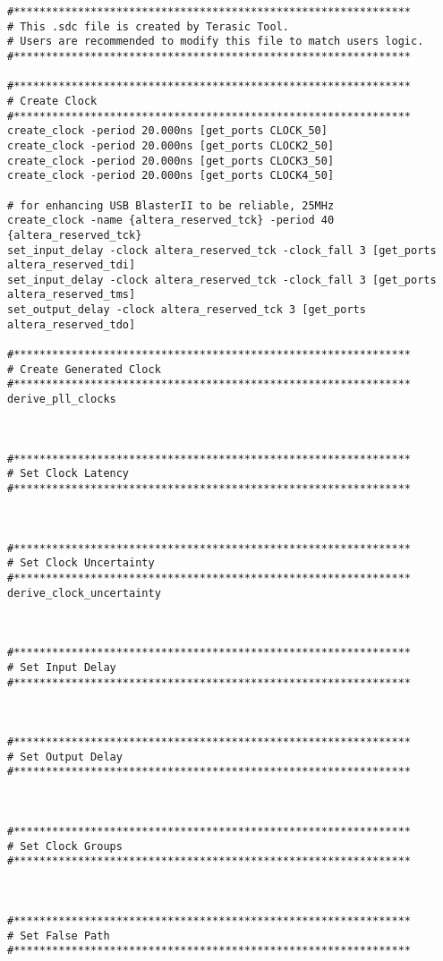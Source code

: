 \begin{verbatim}
#**************************************************************
# This .sdc file is created by Terasic Tool.
# Users are recommended to modify this file to match users logic.
#**************************************************************

#**************************************************************
# Create Clock
#**************************************************************
create_clock -period 20.000ns [get_ports CLOCK_50]
create_clock -period 20.000ns [get_ports CLOCK2_50]
create_clock -period 20.000ns [get_ports CLOCK3_50]
create_clock -period 20.000ns [get_ports CLOCK4_50]

# for enhancing USB BlasterII to be reliable, 25MHz
create_clock -name {altera_reserved_tck} -period 40 {altera_reserved_tck}
set_input_delay -clock altera_reserved_tck -clock_fall 3 [get_ports altera_reserved_tdi]
set_input_delay -clock altera_reserved_tck -clock_fall 3 [get_ports altera_reserved_tms]
set_output_delay -clock altera_reserved_tck 3 [get_ports altera_reserved_tdo]

#**************************************************************
# Create Generated Clock
#**************************************************************
derive_pll_clocks



#**************************************************************
# Set Clock Latency
#**************************************************************



#**************************************************************
# Set Clock Uncertainty
#**************************************************************
derive_clock_uncertainty



#**************************************************************
# Set Input Delay
#**************************************************************



#**************************************************************
# Set Output Delay
#**************************************************************



#**************************************************************
# Set Clock Groups
#**************************************************************



#**************************************************************
# Set False Path
#**************************************************************




\end{verbatim}
